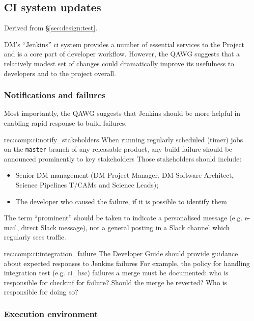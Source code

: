 \subsection{CI system updates}
\label{sec:comp:ci}

Derived from \S\ref{sec:design:test}.

DM's ``Jenkins'' \gls{ci} system provides a number of essential services to the Project and is a core part of developer workflow.
However, the QAWG suggests that a relatively modest set of changes could dramatically improve its usefulness to developers and to the project overall.

\subsubsection{Notifications and failures}

Most importantly, the QAWG suggests that Jenkins should be more helpful in enabling rapid response to build failures.

\begin{recommendation}
    {rec:comp:ci:notify_stakeholders}
    {When running regularly scheduled (timer) jobs on the \texttt{master} branch of any releasable product, any build failure should be announced prominently to key stakeholders}
Those stakeholders should include:
\begin{itemize}
  \item{Senior DM management (DM Project Manager, DM Software Architect, Science Pipelines T/CAMs and Science Leads);}
  \item{The developer who caused the failure, if it is possible to identify them}
\end{itemize}
The term ``prominent'' should be taken to indicate a personalised message (e.g. e-mail, direct Slack message), not a general posting in a Slack channel which regularly sees traffic.
\end{recommendation}

\begin{recommendation}
    {rec:comp:ci:integration_failure}
    {The Developer Guide should provide guidance about expected responses to Jenkins failures}
For example, the policy for handling integration test (e.g. ci\_hsc) failures a merge must be documented: who is responsible for checkinf for failure? Should the merge be reverted? Who is responsible for doing so?
\end{recommendation}

\subsubsection{Execution environment}

